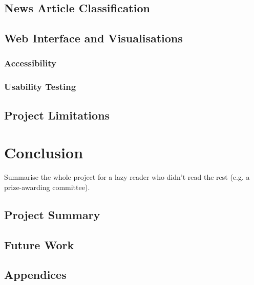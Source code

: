 \documentclass{l4proj}
\begin{document}
\section{News Article Classification} 
\section{Web Interface and Visualisations}
\subsection{Accessibility}
\subsection{Usability Testing}
\section{Project Limitations} 

\chapter{Conclusion}    
Summarise the whole project for a lazy reader who didn't read the rest (e.g. a prize-awarding committee).
\section{Project Summary}
\section{Future Work}
\begin{appendices}
\chapter{Appendices}
\end{appendices}




\end{document}
